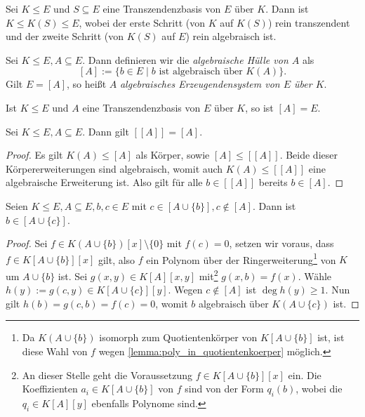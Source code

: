 \begin{corollary}
    Sei $K \leq E$ und $S \subseteq E$ eine Transzendenzbasis von $E$ über $K$. Dann ist $K \leq K(S) \leq E$, wobei der erste Schritt (von $K$ auf $K(S)$) rein transzendent und der zweite Schritt (von $K(S)$ auf $E$) rein algebraisch ist.
\end{corollary}

\begin{definition}
    Sei $K \leq E, A \subseteq E$. Dann definieren wir die \emph{algebraische Hülle von $A$} als
    $$ [A] := \{ b \in E \mid b \text{ ist algebraisch über } K(A) \}. $$
    Gilt $E = [A]$, so heißt $A$ \emph{algebraisches Erzeugendensystem von $E$ über $K$}.
\end{definition}

\begin{remark}
    Ist $K\le E$ und $A$ eine Transzendenzbasis von $E$ über $K$, so ist $[A]=E$.
\end{remark}

\begin{lemma}
    Sei $K \leq E, A \subseteq E$. Dann gilt $[[A]] = [A]$.
\end{lemma}

\begin{proof}
    Es gilt $K(A) \leq [A]$ als Körper, sowie $[A] \leq [[A]]$. Beide dieser Körpererweiterungen sind algebraisch, womit auch $K(A) \leq [[A]]$ eine algebraische Erweiterung ist. Also gilt für alle $b \in [[A]]$ bereits $b \in [A]$.
\end{proof}

\begin{lemma}[Austauschlemma]
    Seien $K \leq E, A \subseteq E, b, c \in E$ mit $c \in [A \cup \{b\}], c \notin [A]$. Dann ist $b \in [A \cup \{c\}]$.
\end{lemma}

\begin{proof}
    Sei $f \in K(A \cup \{b\})[x] \setminus \{0\}$ mit $f(c)=0$, \obda setzen wir voraus, dass $f \in K[A \cup \{b\}][x]$ gilt, also $f$ ein Polynom über der Ringerweiterung\footnote{Da $K(A\cup \{b\})$ isomorph zum Quotientenkörper von $K[A\cup \{b\}]$ ist, ist diese Wahl von $f$ wegen \cref{lemma:poly_in_quotientenkoerper} möglich.} von $K$ um $A\cup \{b\}$ ist. Sei $g(x,y) \in K[A][x,y]$ mit\footnote{An dieser Stelle geht die Voraussetzung $f\in K[A\cup\{b\}][x]$ ein. Die Koeffizienten $a_i\in K[A\cup \{b\}]$ von $f$ sind von der Form $q_i(b)$, wobei die $q_i\in K[A][y]$ ebenfalls Polynome sind.} $g(x,b) = f(x)$. Wähle $h(y) := g(c, y) \in K[A \cup \{c\}][y]$. Wegen $c\not\in [A]$ ist $\deg h(y) \geq 1$. Nun gilt $h(b) = g(c,b) = f(c) = 0$, womit $b$ algebraisch über $K(A \cup \{ c \})$ ist.
\end{proof}

